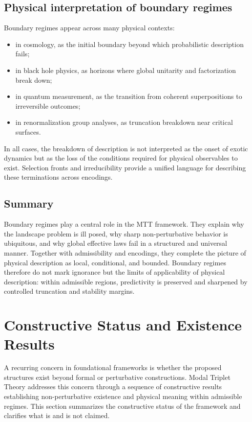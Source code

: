 \documentclass[11pt]{article}
\begin{document}
\subsection{Physical interpretation of boundary regimes}

Boundary regimes appear across many physical contexts:
\begin{itemize}
\item in cosmology, as the initial boundary beyond which probabilistic description fails;
\item in black hole physics, as horizons where global unitarity and factorization break down;
\item in quantum measurement, as the transition from coherent superpositions to irreversible outcomes;
\item in renormalization group analyses, as truncation breakdown near critical surfaces.
\end{itemize}

In all cases, the breakdown of description is not interpreted as the onset of exotic dynamics but as the loss of the conditions required for physical observables to exist. Selection fronts and irreducibility provide a unified language for describing these terminations across encodings.

\subsection{Summary}

Boundary regimes play a central role in the MTT framework. They explain why the landscape problem is ill posed, why sharp non-perturbative behavior is ubiquitous, and why global effective laws fail in a structured and universal manner. Together with admissibility and encodings, they complete the picture of physical description as local, conditional, and bounded.
Boundary regimes therefore do not mark ignorance but the limits of applicability of physical description:
within admissible regions, predictivity is preserved and sharpened by controlled truncation and stability margins.


\section{Constructive Status and Existence Results}

A recurring concern in foundational frameworks is whether the proposed structures exist beyond formal or perturbative constructions. Modal Triplet Theory addresses this concern through a sequence of constructive results establishing non-perturbative existence and physical meaning within admissible regimes. This section summarizes the constructive status of the framework and clarifies what is and is not claimed.
\end{document}
